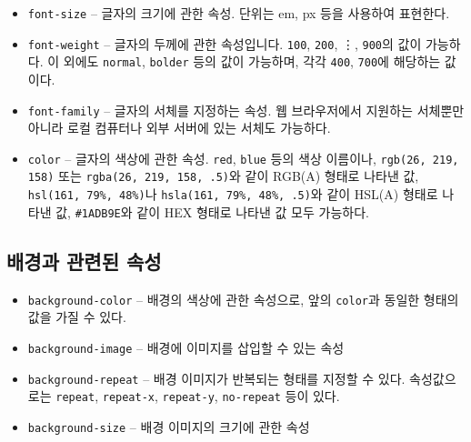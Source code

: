 \begin{itemize}
    \item \texttt{font-size} – 글자의 크기에 관한 속성. 단위는 em, px 등을 사용하여 표현한다.
    \item \texttt{font-weight} – 글자의 두께에 관한 속성입니다. \texttt{100}, \texttt{200}, \vdots, \texttt{900}의 값이 가능하다. 이 외에도 \texttt{normal}, \texttt{bolder} 등의 값이 가능하며, 각각 \texttt{400}, \texttt{700}에 해당하는 값이다.
    \item \texttt{font-family} – 글자의 서체를 지정하는 속성. 웹 브라우저에서 지원하는 서체뿐만 아니라 로컬 컴퓨터나 외부 서버에 있는 서체도 가능하다.
    \item \texttt{color} – 글자의 색상에 관한 속성. \texttt{red}, \texttt{blue} 등의 색상 이름이나, \texttt{rgb(26, 219, 158)} 또는 \texttt{rgba(26, 219, 158, .5)}와 같이 RGB(A) 형태로 나타낸 값, \texttt{hsl(161, 79\%, 48\%)}나 \texttt{hsla(161, 79\%, 48\%, .5)}와 같이 HSL(A) 형태로 나타낸 값, \texttt{\#1ADB9E}와 같이 HEX 형태로 나타낸 값 모두 가능하다.
\end{itemize}

\subsection*{배경과 관련된 속성}

\begin{itemize}
    \item \texttt{background-color} – 배경의 색상에 관한 속성으로, 앞의 \texttt{color}과 동일한 형태의 값을 가질 수 있다.
    \item \texttt{background-image} – 배경에 이미지를 삽입할 수 있는 속성
    \item \texttt{background-repeat} – 배경 이미지가 반복되는 형태를 지정할 수 있다. 속성값으로는 \texttt{repeat}, \texttt{repeat-x}, \texttt{repeat-y}, \texttt{no-repeat} 등이 있다.
    \item \texttt{background-size} – 배경 이미지의 크기에 관한 속성
\end{itemize}
